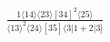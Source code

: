 \documentclass[varwidth, border=5pt]{standalone}
\begin{document}
\begin{my}
$\begin{gathered}
\scriptscriptstyle\frac{1⟨14⟩⟨23⟩[34]^2⟨25⟩}{⟨13⟩^2⟨24⟩[35]⟨3|1+2|3]}
\end{gathered}$
\end{my}
\end{document}
